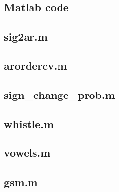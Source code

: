 \documentclass{IEEEtran}
\begin{document}
\begin{appendices}

    \section{Matlab code}
    \subsection{sig2ar.m}\label{code:sig2ar}
    
    \subsection{arordercv.m}\label{code:arordercv}
    
    \subsection{sign\_change\_prob.m}\label{code:signchangeprob}
    
    \subsection{whistle.m}\label{code:whistle}
    
    \subsection{vowels.m}\label{code:vowels}
    
    \subsection{gsm.m}\label{code:gsm}
    
\end{appendices}
\end{document}

